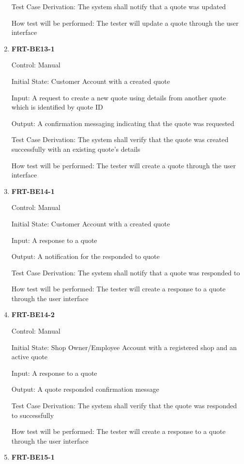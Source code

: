\documentclass[12pt, titlepage]{article}
\begin{document}
\begin{enumerate}
	      Test Case Derivation: The system shall notify that a quote was updated

	      How test will be performed: The tester will update a quote through the user interface

	\item \textbf{FRT-BE13-1}

	      Control: Manual

	      Initial State: Customer Account with a created quote

	      Input: A request to create a new quote using details from another quote which is identified by
	      quote ID

	      Output: A confirmation messaging indicating that the quote was requested

	      Test Case Derivation: The system shall verify that the quote was created successfully with an
	      existing quote's details

	      How test will be performed: The tester will create a quote through the user interface

	\item \textbf{FRT-BE14-1}

	      Control: Manual

	      Initial State: Customer Account with a created quote

	      Input: A response to a quote

	      Output: A notification for the responded to quote

	      Test Case Derivation: The system shall notify that a quote was responded to

	      How test will be performed: The tester will create a response to a quote through the user interface

	\item \textbf{FRT-BE14-2}

	      Control: Manual

	      Initial State: Shop Owner/Employee Account with a registered shop and an active quote

	      Input: A response to a quote

	      Output: A quote responded confirmation message

	      Test Case Derivation: The system shall verify that the quote was responded to successfully

	      How test will be performed: The tester will create a response to a quote through the user interface

	\item \textbf{FRT-BE15-1}


\end{enumerate}
\end{document}
